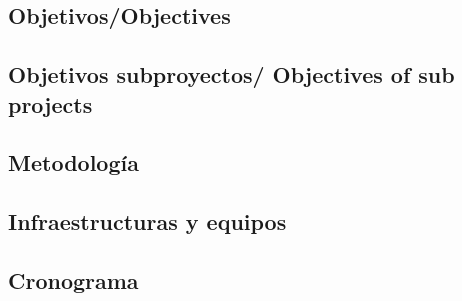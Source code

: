 \documentclass[a4paper,11pt,oneside]{article}
\begin{document}


\subsection*{\sc Objetivos/Objectives}




\subsection*{\sc Objetivos subproyectos/ Objectives of sub projects}





%
%
%
%
%

%
%

\subsection*{\sc Metodología}

%

\subsection*{\sc Infraestructuras y equipos}

%

\subsection*{\sc Cronograma}

%
\end{document}

